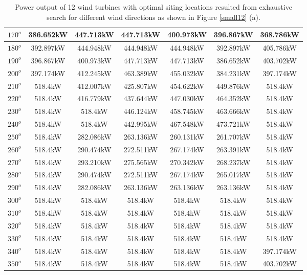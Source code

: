 \begin{table}[H]
\begin{tabular}{|c|c|c|c|c|c|c|}
        		$170^o$	& 386.652kW	& 447.713kW	& 447.713kW	& 400.973kW	& 396.867kW	& 368.786kW	\\ \hline
        		$180^o$	& 392.897kW	& 444.948kW	& 444.948kW	& 444.948kW	& 392.897kW	& 405.786kW	\\ \hline
        		$190^o$	& 396.867kW	& 400.973kW	& 447.713kW	& 447.713kW	& 386.652kW	& 403.702kW	\\ \hline
        		$200^o$	& 397.174kW	& 412.245kW	& 463.389kW	& 455.032kW	& 384.231kW	& 397.174kW	\\ \hline
        		$210^o$	& 518.4kW	& 412.007kW	& 425.807kW	& 454.622kW	& 449.876kW	& 518.4kW	\\ \hline
        		$220^o$	& 518.4kW	& 416.779kW	& 437.644kW	& 447.030kW	& 464.352kW	& 518.4kW	\\ \hline
        		$230^o$	& 518.4kW	& 518.4kW	& 446.124kW	& 458.745kW	& 463.666kW	& 518.4kW	\\ \hline
        		$240^o$	& 518.4kW	& 518.4kW	& 442.995kW	& 467.548kW	& 473.721kW	& 518.4kW	\\ \hline
        		$250^o$	& 518.4kW	& 282.086kW	& 263.136kW	& 260.131kW	& 261.707kW	& 518.4kW	\\ \hline
        		$260^o$	& 518.4kW	& 290.474kW	& 272.511kW	& 267.174kW	& 263.391kW	& 518.4kW	\\ \hline
        		$270^o$	& 518.4kW	& 293.210kW	& 275.565kW	& 270.342kW	& 268.237kW	& 518.4kW	\\ \hline
        		$280^o$	& 518.4kW	& 290.474kW	& 272.511kW	& 267.174kW	& 265.017kW	& 518.4kW	\\ \hline
        		$290^o$	& 518.4kW	& 282.086kW	& 263.136kW	& 263.136kW	& 263.136kW	& 518.4kW	\\ \hline
        		$300^o$	& 518.4kW	& 518.4kW	& 518.4kW	& 518.4kW	& 518.4kW	& 518.4kW	\\ \hline
        		$310^o$	& 518.4kW	& 518.4kW	& 518.4kW	& 518.4kW	& 518.4kW	& 518.4kW	\\ \hline
        		$320^o$	& 518.4kW	& 518.4kW	& 518.4kW	& 518.4kW	& 518.4kW	& 518.4kW	\\ \hline
        		$330^o$	& 518.4kW	& 518.4kW	& 518.4kW	& 518.4kW	& 518.4kW	& 518.4kW	\\ \hline
        		$340^o$	& 518.4kW	& 518.4kW	& 518.4kW	& 518.4kW	& 518.4kW	& 397.174kW	\\ \hline
        		$350^o$	& 518.4kW	& 518.4kW	& 518.4kW	& 518.4kW	& 518.4kW	& 403.702kW	\\ \hline
        	\end{tabular}
        	\caption{Power output of 12 wind turbines with optimal siting locations resulted from exhaustive search for different wind directions as shown in Figure \ref{small12} (a).}
        	\label{table12a}
        \end{table}
